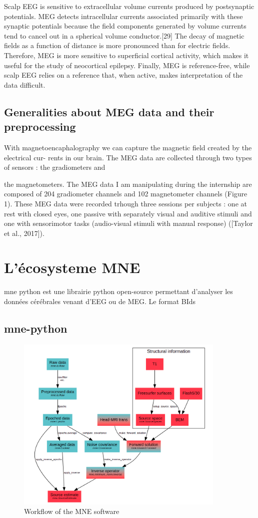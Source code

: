 Scalp EEG is sensitive to extracellular volume currents produced by postsynaptic potentials. MEG detects intracellular currents associated primarily with these synaptic potentials because the field components generated by volume currents tend to cancel out in a spherical volume conductor.[29] The decay of magnetic fields as a function of distance is more pronounced than for electric fields. Therefore, MEG is more sensitive to superficial cortical activity, which makes it useful for the study of neocortical epilepsy. Finally, MEG is reference-free, while scalp EEG relies on a reference that, when active, makes interpretation of the data difficult.


\subsection{Generalities about MEG data and their preprocessing}

With magnetoencaphalography we can capture the magnetic field created by the electrical cur-
rents in our brain. The MEG data are collected through two types of sensors : the gradiometers and

the magnetometers. The MEG data I am manipulating during the internship are composed of 204
gradiometer channels and 102 magnetometer channels (Figure 1). These MEG data were recorded
trhough three sessions per subjects : one at rest with closed eyes, one passive with separately visual
and auditive stimuli and one with sensorimotor tasks (audio-visual stimuli with manual response)
([Taylor et al., 2017]).


\section{L'écosysteme MNE}

mne python est une librairie python open-source permettant d'analyser les données cérébrales venant d'EEG ou de MEG. Le format BIds

\subsection{mne-python}


\begin{figure}[h]
    \centering
    \includegraphics[width=10cm]{images_report/workflow_of_the_mne_software.png}
    \caption{Workflow of the MNE software \cite{GramfortEtAl2013a}}
\end{figure}


